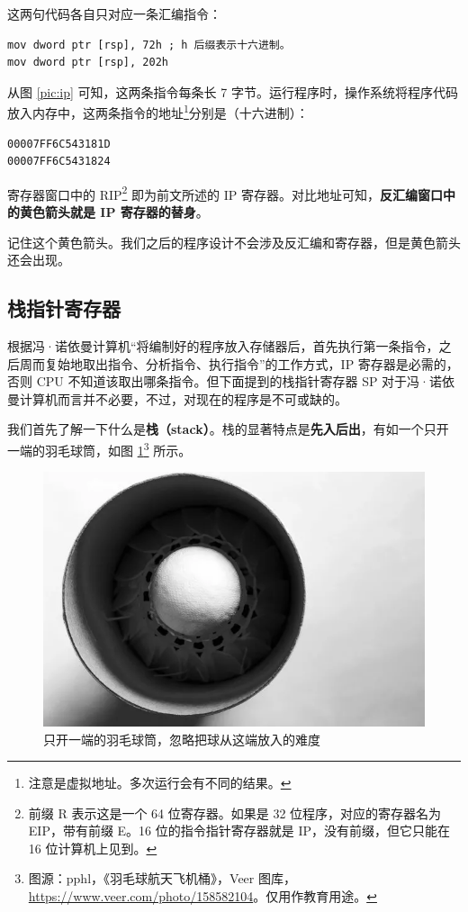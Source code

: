 这两句代码各自只对应一条汇编指令：

\begin{lstlisting}[language=assembly, numbers=none]
mov dword ptr [rsp], 72h ; h 后缀表示十六进制。
mov dword ptr [rsp], 202h
\end{lstlisting}

从图 \ref{pic:ip} 可知，这两条指令每条长 7 字节。运行程序时，操作系统将程序代码放入内存中，这两条指令的地址\footnote{注意是虚拟地址。多次运行会有不同的结果。}分别是（十六进制）：

\begin{lstlisting}[language={}, numbers=none]
00007FF6C543181D
00007FF6C5431824
\end{lstlisting}

寄存器窗口中的 RIP\footnote{前缀 R 表示这是一个 64 位寄存器。如果是 32 位程序，对应的寄存器名为 EIP，带有前缀 E。16 位的指令指针寄存器就是 IP，没有前缀，但它只能在 16 位计算机上见到。} 即为前文所述的 IP 寄存器。对比地址可知，\textbf{反汇编窗口中的黄色箭头就是 IP 寄存器的替身}。

\begin{note}
	记住这个黄色箭头。我们之后的程序设计不会涉及反汇编和寄存器，但是黄色箭头还会出现。
\end{note}

\subsection{栈指针寄存器}

根据冯·诺依曼计算机“将编制好的程序放入存储器后，首先执行第一条指令，之后周而复始地取出指令、分析指令、执行指令”的工作方式，IP 寄存器是必需的，否则 CPU 不知道该取出哪条指令。但下面提到的栈指针寄存器 SP 对于冯·诺依曼计算机而言并不必要，不过，对现在的程序是不可或缺的。

我们首先了解一下什么是\textbf{栈（stack）}。栈的显著特点是\textbf{先入后出}，有如一个只开一端的羽毛球筒，如图 \ref{pic:badminton}\footnote{图源：pphl，《羽毛球航天飞机桶》，Veer 图库，\url{https://www.veer.com/photo/158582104}。仅用作教育用途。} 所示。

\begin{figure}[H]
	\centering
	\includegraphics[width=0.4\linewidth]{pic/badminton.png}
	\caption{只开一端的羽毛球筒，忽略把球从这端放入的难度}
	\label{pic:badminton}
\end{figure}

